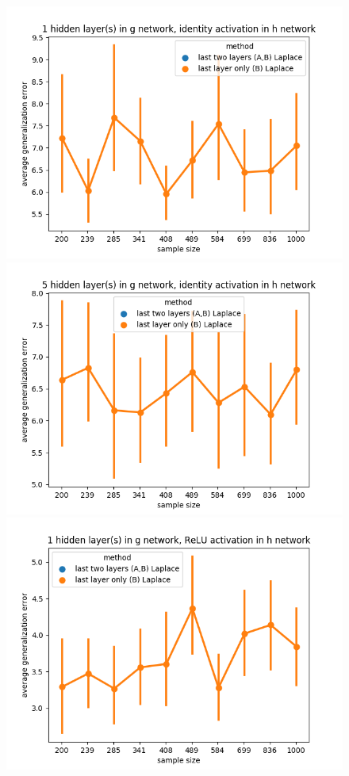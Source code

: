 \documentclass{article} %
\begin{document}
\begin{figure}[h!]
	\begin{center}
		\includegraphics[scale=0.35]{laplace_taskid8.png}
		\includegraphics[scale=0.35]{laplace_taskid9.png}
		\includegraphics[scale=0.35]{laplace_taskid10.png}

\end{center}
\end{figure}
\end{document}
